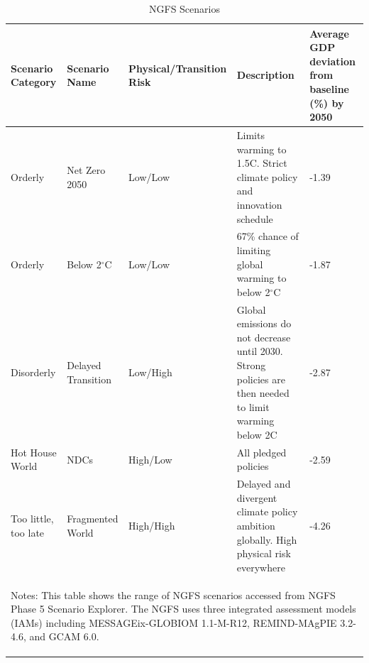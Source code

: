 
\begin{table}[tb!]
\footnotesize
\center
\caption{NGFS Scenarios}
\label{tab:tab2}
\begin{tabularx}{\textwidth}{X X X X X}
\\
\hline
Scenario Category & Scenario Name & Physical/Transition Risk & Description & Average GDP deviation from baseline (\%) by 2050\\
\hline
Orderly & Net Zero 2050 & Low/Low & Limits warming to 1.5C. Strict climate policy and innovation schedule &  -1.39 \\
Orderly & Below 2$^\circ$C & Low/Low & 67\% chance of limiting global warming to below 2$^\circ$C &  -1.87 \\
Disorderly & Delayed Transition & Low/High & Global emissions do not decrease until 2030. Strong policies are then needed to limit warming below 2C &  -2.87 \\
Hot House World & NDCs & High/Low & All pledged policies &  -2.59 \\
Too little, too late & Fragmented World & High/High & Delayed and divergent climate policy ambition globally. High physical risk everywhere &  -4.26 \\
\hline
\multicolumn{5}{p{\textwidth}}{\begin{footnotesize}Notes: This table shows the range of NGFS scenarios accessed from NGFS Phase 5 Scenario Explorer. The NGFS uses three integrated assessment models (IAMs) including MESSAGEix-GLOBIOM 1.1-M-R12, REMIND-MAgPIE 3.2-4.6, and GCAM 6.0.
\end{footnotesize}
}
\end{tabularx}
\end{table}
